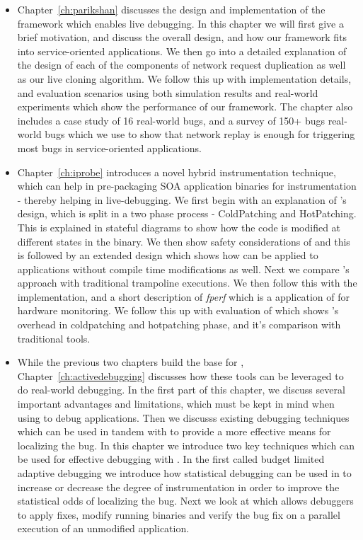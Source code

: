 \begin{itemize}
	\item Chapter~\ref{ch:parikshan} discusses the design and implementation of the \parikshan framework which enables live debugging.
	In this chapter we will first give a brief motivation, and discuss the overall design, and how our framework fits into service-oriented applications.
	We then go into a detailed explanation of the design of each of the components of network request duplication as well as our live cloning algorithm.
	We follow this up with implementation details, and evaluation scenarios using both simulation results and real-world experiments which show the performance of our framework. 
	The chapter also includes a case study of 16 real-world bugs, and a survey of 150+ bugs real-world bugs which we use to show that network replay is enough for triggering most bugs in service-oriented applications.
	
	
	\item Chapter~\ref{ch:iprobe} introduces \iprobe a novel hybrid instrumentation technique, which can help in pre-packaging SOA application binaries for instrumentation - thereby helping in live-debugging.
	We first begin with an explanation of \iprobe's design, which is split in a two phase process - ColdPatching and HotPatching. This is explained in stateful diagrams to show how the code is modified at different states in the binary.
	We then show safety considerations of \iprobe and this is followed by an extended design which shows how \iprobe can be applied to applications without compile time modifications as well. 
	Next we compare \iprobe's approach with traditional trampoline executions. We then follow this with the implementation, and a short description of \textit{fperf} which is a application of \iprobe for hardware monitoring. 
	We follow this up with evaluation of \iprobe which shows \iprobe's overhead in coldpatching and hotpatching phase, and it's comparison with traditional tools.
	
	
	\item While the previous two chapters build the base for \livedebugging, Chapter~\ref{ch:activedebugging} discusses how these tools can be leveraged to do real-world debugging. In the first part of this chapter, we discuss several important advantages and limitations, which must be kept in mind when using \parikshan to debug applications. 
	Then we discusss existing debugging techniques which can be used in tandem with \livedebugging to provide a more effective means for localizing the bug.
	In this chapter we introduce two key techniques which can be used for effective debugging with \parikshan. In the first called budget limited adaptive debugging we introduce how statistical debugging can be used in \parikshan to increase or decrease the degree of instrumentation in order to improve the statistical odds of localizing the bug.
	Next we look at \activedebugging which allows debuggers to apply fixes, modify running binaries and verify the bug fix on a parallel execution of an unmodified application.
	

\end{itemize}
